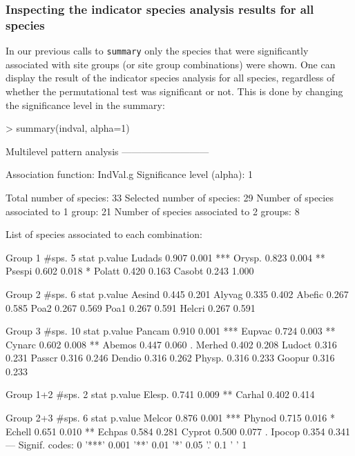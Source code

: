 \documentclass[11pt,a4paper]{article}
\begin{document}
\subsubsection{Inspecting the indicator species analysis results for all species}
In our previous calls to \texttt{summary} only the species that were significantly associated with site groups (or site group combinations) were shown. One can display the result of the indicator species analysis for all species, regardless of whether the permutational test was significant or not. This is done by changing the significance level in the summary:
\begin{Schunk}
\begin{Sinput}
> summary(indval, alpha=1)
\end{Sinput}
\begin{Soutput}
 Multilevel pattern analysis
 ---------------------------

 Association function: IndVal.g
 Significance level (alpha): 1

 Total number of species: 33
 Selected number of species: 29 
 Number of species associated to 1 group: 21 
 Number of species associated to 2 groups: 8 

 List of species associated to each combination: 

 Group 1  #sps.  5 
        stat p.value    
Ludads 0.907   0.001 ***
Orysp. 0.823   0.004 ** 
Psespi 0.602   0.018 *  
Polatt 0.420   0.163    
Casobt 0.243   1.000    

 Group 2  #sps.  6 
        stat p.value
Aesind 0.445   0.201
Alyvag 0.335   0.402
Abefic 0.267   0.585
Poa2   0.267   0.569
Poa1   0.267   0.591
Helcri 0.267   0.591

 Group 3  #sps.  10 
        stat p.value    
Pancam 0.910   0.001 ***
Eupvac 0.724   0.003 ** 
Cynarc 0.602   0.008 ** 
Abemos 0.447   0.060 .  
Merhed 0.402   0.208    
Ludoct 0.316   0.231    
Passcr 0.316   0.246    
Dendio 0.316   0.262    
Physp. 0.316   0.233    
Goopur 0.316   0.233    

 Group 1+2  #sps.  2 
        stat p.value   
Elesp. 0.741   0.009 **
Carhal 0.402   0.414   

 Group 2+3  #sps.  6 
        stat p.value    
Melcor 0.876   0.001 ***
Phynod 0.715   0.016 *  
Echell 0.651   0.010 ** 
Echpas 0.584   0.281    
Cyprot 0.500   0.077 .  
Ipocop 0.354   0.341    
---
Signif. codes:  0 '***' 0.001 '**' 0.01 '*' 0.05 '.' 0.1 ' ' 1 
\end{Soutput}
\end{Schunk}
\end{document}
